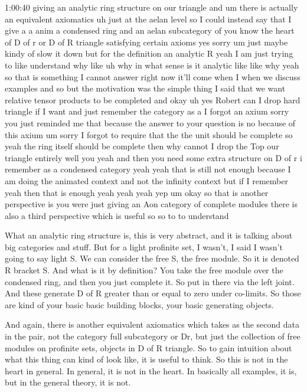 \begin{unfinished}{1:00:40}
giving an analytic ring structure on our triangle and um there is actually an equivalent axiomatics uh just at the aelan level so I could instead say that I give a a anim a condensed ring and an aelan subcategory of you know the heart of D of r or D of R triangle satisfying certain axioms yes sorry um just maybe kindy of slow it down but for the definition an analytic R yeah I am just trying to like understand why like uh why in what sense is it analytic like like why yeah so that is  something I cannot answer right now it'll come when I when we discuss examples and so but the motivation was the simple thing I said that we want relative tensor products to be completed and okay uh yes Robert can I drop hard triangle if I want and just remember the category as a I forgot an axium sorry you just reminded me that because the answer to your question is no because of this axium um sorry I forgot to require that the the unit should be complete so yeah the ring itself should be complete then why cannot I drop the Top our triangle entirely well you yeah and then you need some extra structure on D of r i remember as a condensed category yeah yeah that is  still not enough because I am doing the animated context and not the infinity context but if I remember yeah then that is  enough yeah yeah yeah yep um okay so that is  another perspective is you were just giving an Aon category of complete modules there is also a third perspective which is useful so so to to understand

What an analytic ring structure is, this is very abstract, and it is talking about big categories and stuff. But for a light profinite set, I wasn't, I said I wasn't going to say light S. We can consider the free S, the free module. So it is denoted R bracket S. And what is it by definition? You take the free module over the condensed ring, and then you just complete it. So put in there via the left joint. And these generate D of R greater than or equal to zero under co-limits. So those are kind of your basic basic building blocks, your basic generating objects. 

And again, there is another equivalent axiomatics which takes as the second data in the pair, not the category full subcategory or Dr, but just the collection of free modules on profinite sets, objects in D of R triangle. So to gain intuition about what this thing can kind of look like, it is useful to think. So this is not in the heart in general. In general, it is not in the heart. In basically all examples, it is, but in the general theory, it is not. 


\end{unfinished}
